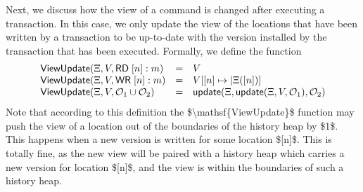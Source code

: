 \documentclass[a4paper,UKenglish]{article}%
\theoremstyle{plain}
\begin{document}
Next, we discuss how the view of a command is changed after executing 
a transaction. In this case, we only update the view of the locations that 
have been written by a transaction to be up-to-date with the version 
installed by the transaction that has been executed. 
Formally, we define the function 
\[
\begin{array}{lll}
\mathsf{ViewUpdate}(\Xi, V, \mathsf{RD}\;[n]: m) &=& V\\
\mathsf{ViewUpdate}(\Xi, V, \mathsf{WR}\;[n]: m) &=& V[ [n] \mapsto \lvert \Xi([n])]\\
\mathsf{ViewUpdate}(\Xi, V, \mathcal{O}_1 \cup \mathcal{O}_2) &=& \mathsf{update}(\Xi, \mathsf{update}(\Xi, V, \mathcal{O}_1), \mathcal{O}_2)
\end{array}
\]
\ac{Note that according to this definition the $\mathsf{ViewUpdate}$ function may push the view of a 
location out of the boundaries of the history heap by $1$. This happens when a new version is written 
for some location $[n]$. This is totally fine, as the new view will be paired with a history heap which 
carries a new version for location $[n]$, and the view is within the boundaries of such a history heap.}
\end{document}
